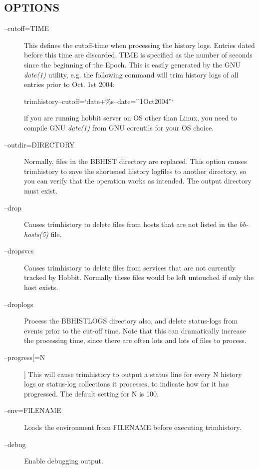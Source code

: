  
\subsection{OPTIONS}
\begin{description}
\item[--cutoff=TIME] This defines the cutoff-time when processing the
  history logs. Entries dated before this time are discarded. TIME is
  specified as the number of seconds since the beginning of the
  Epoch. This is easily generated by the GNU \emph{date(1)} utility,
  e.g. the following command will trim history logs of all entries
  prior to Oct. 1st 2004:  



  
trimhistory--cutoff=`date+\%s--date=''1Oct2004''` 

  if you are running hobbit server on OS other than Linux, you need to 
  compile GNU \emph{date(1)} from GNU coreutils for your OS choice.
 

\item[--outdir=DIRECTORY] Normally, files in the BBHIST directory are
  replaced. This option causes trimhistory to save the shortened
  history logfiles to another directory, so you can verify that the
  operation works as intended. The output directory must exist. 


 

\item[--drop] Causes trimhistory to delete files from hosts that are
  not listed in the \emph{bb-hosts(5)} file. 

 

\item[--dropsvcs] Causes trimhistory to delete files from services
  that are not currently tracked by Hobbit. Normally these files would
  be left untouched if only the host exists. 

 

\item[--droplogs] Process the BBHISTLOGS directory also, and delete
  status-logs from events prior to the cut-off time. Note that this
  can dramatically increase the processing time, since there are often
  lots and lots of files to process. 


 

\item[--progress[=N]] This will cause trimhistory to output a status
  line for every N history logs or status-log collections it
  processes, to indicate how far it has progressed. The default
  setting for N is 100. 


 

\item[--env=FILENAME] Loads the environment from FILENAME before executing trimhistory. 

 

\item[--debug] Enable debugging output. 

 
\end{description}
